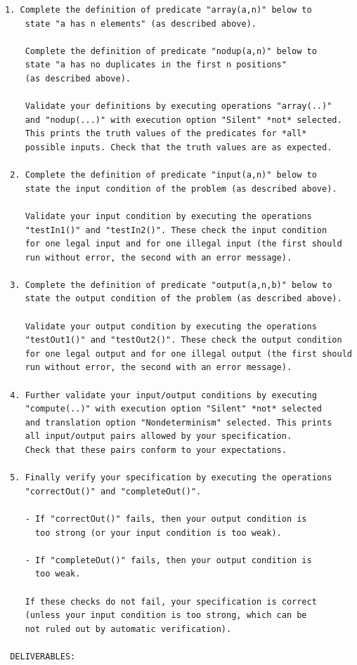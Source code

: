 \documentclass{article}
\begin{document}
\begin{lstlisting}[mathescape=true, columns=flexible]
 1. Complete the definition of predicate "array(a,n)" below to
    state "a has n elements" (as described above).
 
    Complete the definition of predicate "nodup(a,n)" below to
    state "a has no duplicates in the first n positions" 
    (as described above).
 
    Validate your definitions by executing operations "array(..)"
    and "nodup(...)" with execution option "Silent" *not* selected. 
    This prints the truth values of the predicates for *all* 
    possible inputs. Check that the truth values are as expected.
 
 2. Complete the definition of predicate "input(a,n)" below to
    state the input condition of the problem (as described above).
 
    Validate your input condition by executing the operations
    "testIn1()" and "testIn2()". These check the input condition
    for one legal input and for one illegal input (the first should
    run without error, the second with an error message).
 
 3. Complete the definition of predicate "output(a,n,b)" below to
    state the output condition of the problem (as described above).
 
    Validate your output condition by executing the operations
    "testOut1()" and "testOut2()". These check the output condition
    for one legal output and for one illegal output (the first should
    run without error, the second with an error message).
 
 4. Further validate your input/output conditions by executing 
    "compute(..)" with execution option "Silent" *not* selected
    and translation option "Nondeterminism" selected. This prints 
    all input/output pairs allowed by your specification.
    Check that these pairs conform to your expectations.
 
 5. Finally verify your specification by executing the operations 
    "correctOut()" and "completeOut()".
 
    - If "correctOut()" fails, then your output condition is 
      too strong (or your input condition is too weak).
 
    - If "completeOut()" fails, then your output condition is 
      too weak.
 
    If these checks do not fail, your specification is correct
    (unless your input condition is too strong, which can be
    not ruled out by automatic verification).
 
 DELIVERABLES:
 

\end{lstlisting}
\end{document}
